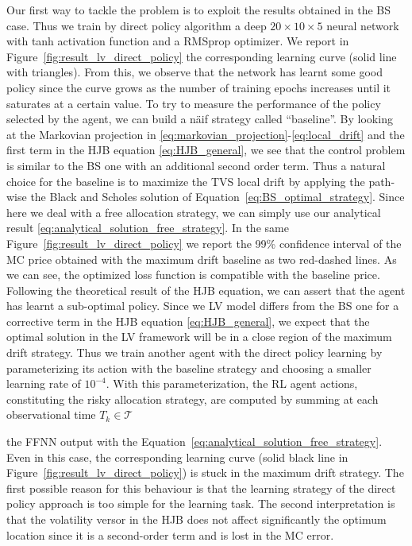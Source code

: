 \documentclass[runningheads]{m2ef}
\newcommand{\quotations}[1]{``#1''}
\newcommand\soutpars[1]{\let\helpcmd\sout\parhelp#1\par\relax\relax}
\newcommand{\remove}[1]{{\color{red} \soutpars{{#1}}}}%
\begin{document}
	Our first way to tackle the problem is to exploit the results obtained in the BS case. Thus we train by direct policy algorithm a deep $20\times 10\times 5$ neural network with tanh activation function and a RMSprop optimizer. We report in Figure~\ref{fig:result_lv_direct_policy} the corresponding learning curve (solid line with triangles). From this, we observe that the network has learnt some good policy since the curve grows as the number of training epochs increases until it saturates at a certain value. To try to measure the performance of the policy selected by the agent, we can build a n\"aif strategy called \quotations{baseline}. By looking at the Markovian projection in \eqref{eq:markovian_projection}-\eqref{eq:local_drift} and the first term in the HJB equation \eqref{eq:HJB_general}, we see that the control problem is similar to the BS one with an additional second order term. Thus a natural choice for the baseline is to maximize the TVS local drift by applying the path-wise the Black and Scholes solution of Equation~\eqref{eq:BS_optimal_strategy}. Since here we deal with a free allocation strategy, we can simply use our analytical result \eqref{eq:analytical_solution_free_strategy}. In the same Figure~\ref{fig:result_lv_direct_policy} we report the 99\% confidence interval of the MC price obtained with the maximum drift baseline as two red-dashed lines. As we can see, the optimized loss function is compatible with the baseline price. Following the theoretical result of the HJB equation, we can assert that the agent has learnt a sub-optimal policy. Since we LV model differs from the BS one for a corrective term in the HJB equation \eqref{eq:HJB_general}, we expect that the optimal solution  in the LV framework will be in a close region of the maximum drift strategy. Thus we train another agent with the direct policy learning by parameterizing its action with the baseline strategy and choosing a smaller learning rate of $10^{-4}$. With this parameterization, the RL agent actions, constituting the risky allocation strategy, are computed by summing at each observational time $T_k\in\mathcal{T}$ \remove{the risky allocation strategy is obtained by summing} the FFNN output with the Equation~\eqref{eq:analytical_solution_free_strategy}. Even in this case, the corresponding learning curve (solid black line in Figure~\ref{fig:result_lv_direct_policy}) is stuck in the maximum drift strategy. The first possible reason for this behaviour is that the learning strategy of the direct policy approach is too simple for the learning task. The second interpretation is that the volatility versor in the HJB does not affect significantly the optimum location since it is a second-order term and is lost in the MC error. 
\end{document}
